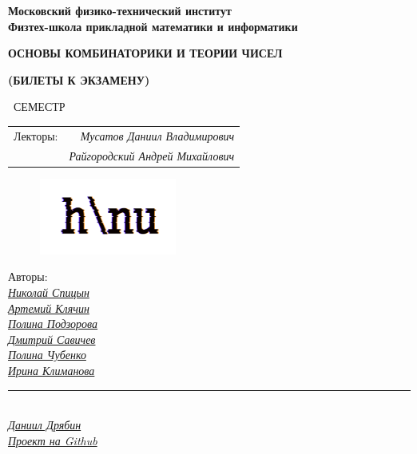 
\newcommand{\GithubLink}{https://github.com/MIPT-Group/Lectures_Tex_Club}

\begin{titlepage}
	\clearpage\thispagestyle{empty}
	\centering
	
	
	\textbf{Московский физико-технический институт \\ Физтех-школа прикладной математики и информатики}
	\vspace{20ex}
	\vspace{13ex}
	
	{\textbf{{ОСНОВЫ КОМБИНАТОРИКИ И ТЕОРИИ ЧИСЕЛ}}}

	{\textbf{(БИЛЕТЫ К ЭКЗАМЕНУ)}}
	
	\SemesterNumber\ СЕМЕСТР  
	\vspace{3ex}
	
	\begin{tabular}{rr}
		Лекторы:\hspace{-16pt} & \textit{Мусатов Даниил Владимирович}
		\\
		& \textit{Райгородский Андрей Михайлович}
	\end{tabular}
	
	\begin{figure}[!ht]
		\centering
		\includegraphics[width=0.4\textwidth]{images/logo_ltc.png}
	\end{figure}

	\begin{flushright}
		\noindent
		Авторы: 
		\\
		\href{https://vk.com/spitsynn}{\textit{Николай Спицын}}
		\\
		\href{https://vk.com/id340504554}{\textit{Артемий Клячин}}
		\\
		\href{https://vk.com/id165779384}{\textit{Полина Подзорова}}
		\\
		\href{https://vk.com/dimasav123}{\textit{Дмитрий Савичев}}
		\\
		\href{https://vk.com/poli.dobro}{\textit{Полина Чубенко}}
		\\
		\href{https://vk.com/meraklim}{\textit{Ирина Климанова}}
		\\
		\rule{90pt}{0.5pt}
		\\
		\href{https://vk.com/ax_equals_b}{\textit{Даниил Дрябин}}
		\\
		\href{\GithubLink}{\textit{Проект на Github}}
	\end{flushright}
	
	\vfill
	\CourseDate
	\pagebreak
\end{titlepage}